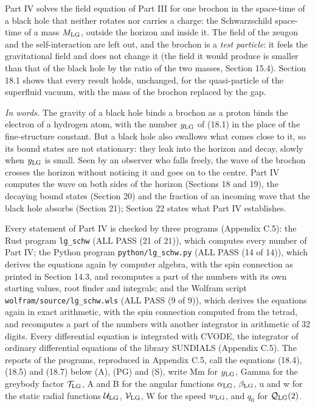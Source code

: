 \documentclass[
  10pt,
]{article}
\begin{document}
Part IV solves the field equation of Part III for one brochon in the
space-time of a black hole that neither rotates nor carries a charge:
the Schwarzschild space-time of a mass \(M_{\rm LG}\), outside the
horizon and inside it. The field of the zeugon and the self-interaction
are left out, and the brochon is a \emph{test particle}: it feels the
gravitational field and does not change it (the field it would produce
is smaller than that of the black hole by the ratio of the two masses,
Section 15.4). Section 18.1 shows that every result holds, unchanged,
for the quasi-particle of the superfluid vacuum, with the mass of the
brochon replaced by the gap.

\emph{In words.} The gravity of a black hole binds a brochon as a proton
binds the electron of a hydrogen atom, with the number \(y_{\rm LG}\) of
(18.1) in the place of the fine-structure constant. But a black hole
also swallows what comes close to it, so its bound states are not
stationary: they leak into the horizon and decay, slowly when
\(y_{\rm LG}\) is small. Seen by an observer who falls freely, the wave
of the brochon crosses the horizon without noticing it and goes on to
the centre. Part IV computes the wave on both sides of the horizon
(Sections 18 and 19), the decaying bound states (Section 20) and the
fraction of an incoming wave that the black hole absorbs (Section 21);
Section 22 states what Part IV establishes.

Every statement of Part IV is checked by three programs (Appendix C.5):
the Rust program \texttt{lg\_schw} (ALL PASS (21 of 21)), which computes
every number of Part IV; the Python program \texttt{python/lg\_schw.py}
(ALL PASS (14 of 14)), which derives the equations again by computer
algebra, with the spin connection as printed in Section 14.3, and
recomputes a part of the numbers with its own starting values, root
finder and integrals; and the Wolfram script
\texttt{wolfram/source/lg\_schw.wls} (ALL PASS (9 of 9)), which derives
the equations again in exact arithmetic, with the spin connection
computed from the tetrad, and recomputes a part of the numbers with
another integrator in arithmetic of 32 digits. Every differential
equation is integrated with CVODE, the integrator of ordinary
differential equations of the library SUNDIALS (Appendix C.5). The
reports of the programs, reproduced in Appendix C.5, call the equations
(18.4), (18.5) and (18.7) below (A), (PG) and (S), write Mm for
\(y_{\rm LG}\), Gamma for the greybody factor \(\mathcal T_{\rm LG}\), A
and B for the angular functions \(\alpha_{\rm LG}\), \(\beta_{\rm LG}\),
u and w for the static radial functions \(\mathcal U_{\rm LG}\),
\(\mathcal V_{\rm LG}\), W for the speed \(w_{\rm LG}\), and \(q_0\) for
\(\mathcal Q_{\rm LG}(2)\).
\end{document}
